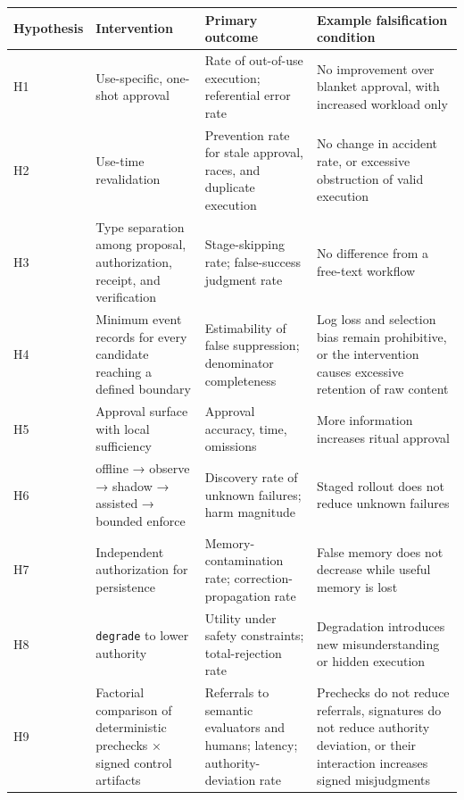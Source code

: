 {\def\LTcaptype{none} %
\begin{longtable}[]{@{}
  >{\raggedright\arraybackslash}p{}
  >{\raggedright\arraybackslash}p{}
  >{\raggedright\arraybackslash}p{}
  >{\raggedright\arraybackslash}p{}@{}}
\toprule\noalign{}
\begin{minipage}[b]{\linewidth}\raggedright
Hypothesis
\end{minipage} & \begin{minipage}[b]{\linewidth}\raggedright
Intervention
\end{minipage} & \begin{minipage}[b]{\linewidth}\raggedright
Primary outcome
\end{minipage} & \begin{minipage}[b]{\linewidth}\raggedright
Example falsification condition
\end{minipage} \\
\midrule\noalign{}
\endhead
\bottomrule\noalign{}
\endlastfoot
H1 & Use-specific, one-shot approval & Rate of out-of-use execution; referential error rate & No improvement over blanket approval, with increased workload only \\
H2 & Use-time revalidation & Prevention rate for stale approval, races, and duplicate execution & No change in accident rate, or excessive obstruction of valid execution \\
H3 & Type separation among proposal, authorization, receipt, and verification & Stage-skipping rate; false-success judgment rate & No difference from a free-text workflow \\
H4 & Minimum event records for every candidate reaching a defined boundary & Estimability of false suppression; denominator completeness & Log loss and selection bias remain prohibitive, or the intervention causes excessive retention of raw content \\
H5 & Approval surface with local sufficiency & Approval accuracy, time, omissions & More information increases ritual approval \\
H6 & offline → observe → shadow → assisted → bounded enforce & Discovery rate of unknown failures; harm magnitude & Staged rollout does not reduce unknown failures \\
H7 & Independent authorization for persistence & Memory-contamination rate; correction-propagation rate & False memory does not decrease while useful memory is lost \\
H8 & \passthrough{\lstinline!degrade!} to lower authority & Utility under safety constraints; total-rejection rate & Degradation introduces new misunderstanding or hidden execution \\
H9 & Factorial comparison of deterministic prechecks × signed control artifacts & Referrals to semantic evaluators and humans; latency; authority-deviation rate & Prechecks do not reduce referrals, signatures do not reduce authority deviation, or their interaction increases signed misjudgments \\
\end{longtable}
}

